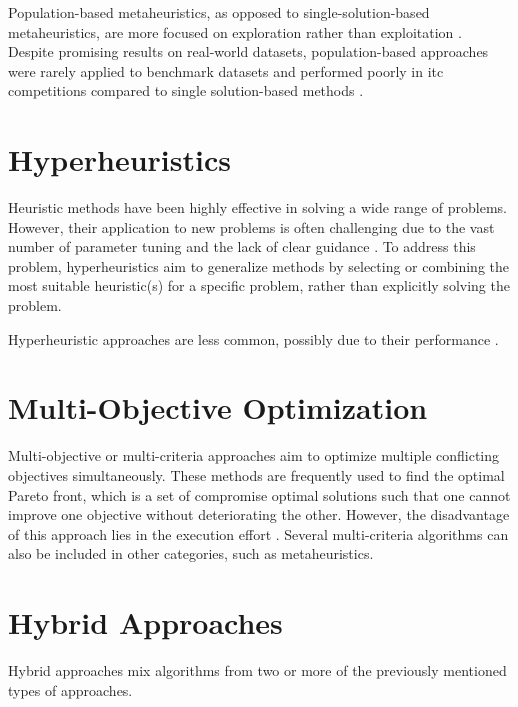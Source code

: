 Population-based metaheuristics, as opposed to single-solution-based metaheuristics, are more focused on exploration rather than exploitation \cite{talbi2009metaheuristics,du2016search}. Despite promising results on real-world datasets, population-based approaches were rarely applied to benchmark datasets and performed poorly in \ac{itc} competitions compared to single solution-based methods \cite{abdipoor_meta-heuristic_2023}.


\section{Hyperheuristics}

Heuristic methods have been highly effective in solving a wide range of problems. However, their application to new problems is often challenging due to the vast number of parameter tuning and the lack of clear guidance \cite{hyper_heuristics_survey}. To address this problem, hyperheuristics aim to generalize methods by selecting or combining the most suitable heuristic(s) for a specific problem, rather than explicitly solving the problem.

Hyperheuristic approaches are less common, possibly due to their performance \cite{chen_survey_2021}.

\section{Multi-Objective Optimization}\label{sec:mo}

Multi-objective or multi-criteria approaches aim to optimize multiple conflicting objectives simultaneously. These methods are frequently used to find the optimal Pareto front, which is a set of compromise optimal solutions such that one cannot improve one objective without deteriorating the other. However, the disadvantage of this approach lies in the execution effort \cite{chen_survey_2021}. Several multi-criteria algorithms can also be included in other categories, such as metaheuristics.

\section{Hybrid Approaches}

Hybrid approaches mix algorithms from two or more of the previously mentioned types of approaches.

